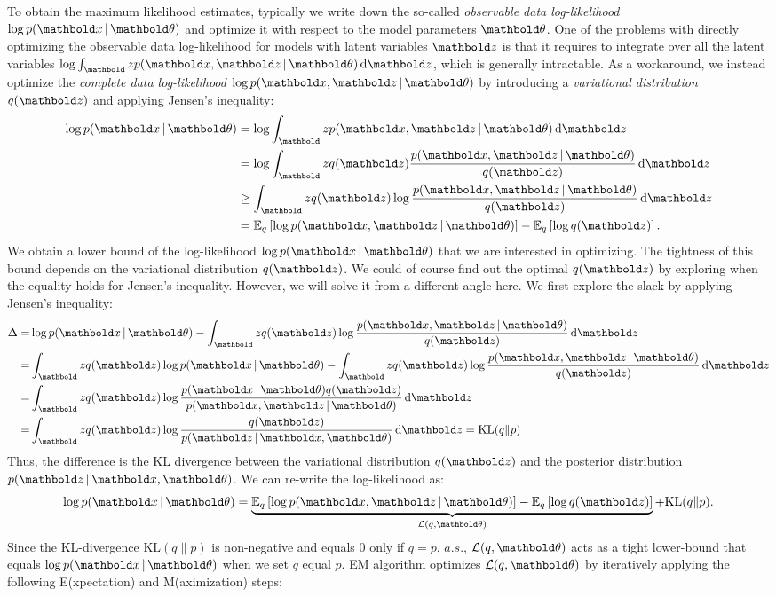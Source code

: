 To obtain the maximum likelihood estimates, typically we write down the so-called \textit{observable data log-likelihood} $\log p(\mbx \g \mb\theta)$ and optimize it with respect to the model parameters $\mb\theta$. One of the problems with directly optimizing the observable data log-likelihood for models with latent variables $\mbz$ is that it requires to integrate over all the latent variables $\log \int_\mbz p(\mbx, \mbz \g \mb\theta) \dif\mbz$, which is generally intractable. As a workaround, we instead optimize the \textit{complete data log-likelihood} $\log p(\mbx, \mbz \g \mb \theta)$ by introducing a \textit{variational distribution} $q(\mbz)$ and applying Jensen's inequality:
\begin{equation}
\begin{split}
\log p(\mbx \g \mb\theta) &= \log\int_\mbz p(\mbx, \mbz \g \mb\theta) \dif{\mbz}\\
&= \log\int_\mbz q(\mbz) \frac{p(\mbx, \mbz \g \mb\theta)}{q(\mbz)} \dif{\mbz}\\
&\geq \int_\mbz q(\mbz) \log\frac{p(\mbx, \mbz \g \mb\theta)}{q(\mbz)} \dif\mbz\\
&= \EE{q}{\log p(\mbx, \mbz \g \mb\theta)} - \EE{q}{\log q(\mbz)}.
\end{split}
\label{chpt:background:eq:em}
\end{equation}
We obtain a lower bound of the log-likelihood $\log p(\mbx \g \mb\theta)$ that we are interested in optimizing. The tightness of this bound depends on the variational distribution $q(\mbz)$. We could of course find out the optimal $q(\mbz)$ by exploring when the equality holds for Jensen's inequality. However, we will solve it from a different angle here. We first explore the slack by applying Jensen's inequality:
\begin{equation}
\begin{split}
\Delta =& \log p(\mbx \g \mb\theta) - \int_\mbz q(\mbz) \log\frac{p(\mbx, \mbz \g \mb\theta)}{q(\mbz)} \dif\mbz \\
=& \int_\mbz q(\mbz)\log p(\mbx \g \mb\theta) - \int_\mbz q(\mbz) \log\frac{p(\mbx, \mbz \g \mb\theta)}{q(\mbz)} \dif\mbz\\
=& \int_\mbz q(\mbz) \log\frac{p(\mbx \g \mb\theta) q(\mbz)} {p(\mbx, \mbz \g \mb\theta)}\dif\mbz\\
=& \int_\mbz q(\mbz) \log\frac{ q(\mbz)} {p(\mbz \g \mbx, \mb\theta)}\dif\mbz = \textrm{KL}(q\|p)
\end{split}
\label{chpt:background:eq:em_kl}
\end{equation}
Thus, the difference is the \gls{KL} divergence between the variational distribution $q(\mbz)$ and the posterior distribution $p(\mbz \g \mbx, \mb\theta)$. We can re-write the log-likelihood as:
\[
\log p(\mbx \g \mb\theta) = \underbrace{\EE{q}{\log p(\mbx, \mbz \g \mb\theta)} - \EE{q}{\log q(\mbz)}}_{\cL(q, \mb\theta)} + \textrm{KL}(q\|p).
\]
Since the \gls{KL}-divergence $\textrm{KL}(q\|p)$ is non-negative and equals $0$ only if $q = p$, $a.s.$, $\cL(q, \mb\theta)$ acts as a tight lower-bound that equals $\log p(\mbx \g \mb\theta)$ when we set $q$ equal $p$. \gls{EM} algorithm optimizes $\cL(q, \mb\theta)$ by iteratively applying the following E(xpectation) and M(aximization) steps:

